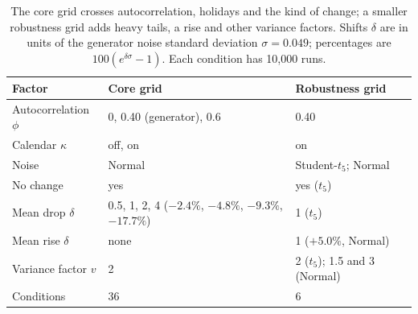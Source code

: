 \begin{table}[t]
\centering
\caption{The core grid crosses autocorrelation, holidays and the kind of change; a smaller robustness grid adds heavy tails, a rise and other variance factors. Shifts $\delta$ are in units of the generator noise standard deviation $\sigma = 0.049$; percentages are $100(e^{\delta\sigma}-1)$. Each condition has 10,000 runs.}
\label{tab:simconditions}
\begin{tabular}{@{}p{2.9cm}p{6.6cm}p{5.6cm}@{}}
\toprule
Factor & Core grid & Robustness grid \\
\midrule
Autocorrelation $\phi$ & 0, 0.40 (generator), 0.6 & 0.40 \\
Calendar $\kappa$ & off, on & on \\
Noise & Normal & Student-$t_5$; Normal \\
No change & yes & yes ($t_5$) \\
Mean drop $\delta$ & 0.5, 1, 2, 4 ($-2.4\%$, $-4.8\%$, $-9.3\%$, $-17.7\%$) & 1 ($t_5$) \\
Mean rise $\delta$ & none & 1 ($+5.0\%$, Normal) \\
Variance factor $v$ & 2 & 2 ($t_5$); 1.5 and 3 (Normal) \\
\midrule
Conditions & 36 & 6 \\
\bottomrule
\end{tabular}
\end{table}
